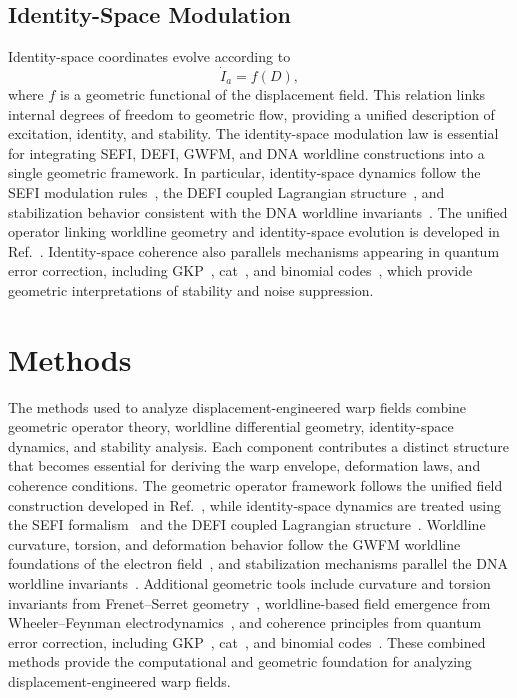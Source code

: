 \documentclass[aip,adv,reprint]{revtex4-2}
\begin{document}
\subsection{Identity-Space Modulation}

Identity-space coordinates evolve according to
\begin{equation}
\dot{I}_a=f(D),
\end{equation}
where $f$ is a geometric functional of the displacement field. This relation
links internal degrees of freedom to geometric flow, providing a unified
description of excitation, identity, and stability. The identity-space
modulation law is essential for integrating SEFI, DEFI, GWFM, and DNA worldline
constructions into a single geometric framework. In particular, identity-space
dynamics follow the SEFI modulation rules~\cite{Dutton_SEFI_JMP_2026}, the DEFI
coupled Lagrangian structure~\cite{Dutton_DEFI_2026}, and stabilization behavior
consistent with the DNA worldline invariants~\cite{Dutton_DNA_2026}. The unified
operator linking worldline geometry and identity-space evolution is developed in
Ref.~\cite{Dutton_Unified_JMP_2026}. Identity-space coherence also parallels
mechanisms appearing in quantum error correction, including GKP~\cite{GKP_2001},
cat~\cite{Mirrahimi_2014}, and binomial codes~\cite{Michael_2016}, which provide
geometric interpretations of stability and noise suppression.

\section{Methods}

The methods used to analyze displacement-engineered warp fields combine geometric
operator theory, worldline differential geometry, identity-space dynamics, and
stability analysis. Each component contributes a distinct structure that becomes
essential for deriving the warp envelope, deformation laws, and coherence
conditions. The geometric operator framework follows the unified field
construction developed in Ref.~\cite{Dutton_Unified_JMP_2026}, while identity-space
dynamics are treated using the SEFI formalism~\cite{Dutton_SEFI_JMP_2026} and the
DEFI coupled Lagrangian structure~\cite{Dutton_DEFI_2026}. Worldline curvature,
torsion, and deformation behavior follow the GWFM worldline foundations of the
electron field~\cite{Dutton_GWFM_JMP_2026}, and stabilization mechanisms parallel
the DNA worldline invariants~\cite{Dutton_DNA_2026}. Additional geometric tools
include curvature and torsion invariants from Frenet--Serret geometry~\cite{Frenet_1851,Serret_1851},
worldline-based field emergence from Wheeler--Feynman electrodynamics~\cite{Wheeler_Feynman_1945,Wheeler_Feynman_1949},
and coherence principles from quantum error correction, including GKP~\cite{GKP_2001},
cat~\cite{Mirrahimi_2014}, and binomial codes~\cite{Michael_2016}. These combined
methods provide the computational and geometric foundation for analyzing
displacement-engineered warp fields.
\end{document}

